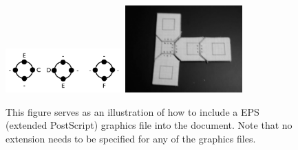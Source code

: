 \documentclass[runningheads]{llncs}
\begin{document}
\begin{figure}
\begin{center}
\includegraphics[width=0.4\textwidth]{Figures/ExampleEPS}
\includegraphics[width=0.4\textwidth]{Figures/PDF-Example}
\end{center}
\caption[ ]{This figure serves as an illustration of how to include a EPS (extended PostScript) graphics file into the document. Note that no extension needs to be specified for any of the graphics files.} 
\label{fig:ExampleEPSandPDF} 
\end{figure}


\end{document}
